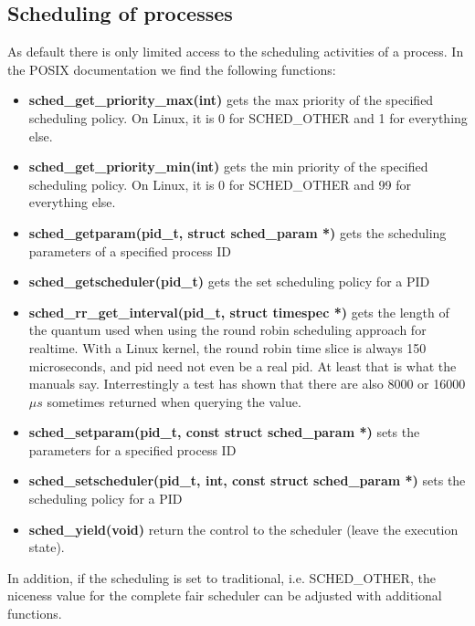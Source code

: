 \documentclass[]{scrartcl}
\begin{document}
\subsection{Scheduling of processes}

As default there is only limited access to the scheduling activities of a process.
In the POSIX documentation we find the following functions:

\begin{itemize}
	\item \textbf{sched\_get\_priority\_max(int)}
		gets the max priority of the specified scheduling policy. On Linux, it is 0 for SCHED\_OTHER and 1 for everything else. 
	
	\item \textbf{sched\_get\_priority\_min(int)}
		gets the min priority of the specified scheduling policy. On Linux, it is 0 for SCHED\_OTHER and 99 for everything else. 
		
	\item \textbf{sched\_getparam(pid\_t, struct sched\_param *)}
		gets the scheduling parameters of a specified process ID
	
	\item \textbf{sched\_getscheduler(pid\_t)}
		gets the set scheduling policy for a PID
	
	\item \textbf{sched\_rr\_get\_interval(pid\_t, struct timespec *)}
		gets the length of the quantum used when using the round robin scheduling approach for realtime.
		With a Linux kernel, the round robin time slice is always 150 microseconds, and pid need not even be a real pid. At least that is what the manuals say. Interrestingly a test has shown that there are also 8000 or 16000 $\mu s$ sometimes returned when querying the value.
	
	\item \textbf{sched\_setparam(pid\_t, const struct sched\_param *)}
		sets the parameters for a specified process ID
	
	\item \textbf{sched\_setscheduler(pid\_t, int, const struct sched\_param *)}
		sets the scheduling policy for a PID
	
	\item \textbf{sched\_yield(void)}
		return the control to the scheduler (leave the execution state).
\end{itemize}

In addition, if the scheduling is set to traditional, i.e. SCHED\_OTHER, the niceness value for the complete fair scheduler can be adjusted with additional functions. 
\end{document}
